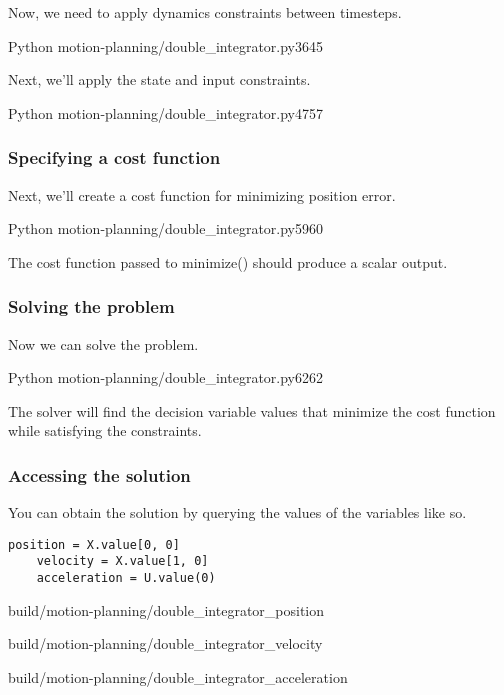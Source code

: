 Now, we need to apply dynamics constraints between timesteps.
\begin{coderemotesubset}{Python}
  {motion-planning/double_integrator.py}{36}{45}
\end{coderemotesubset}

Next, we'll apply the state and input constraints.
\begin{coderemotesubset}{Python}
  {motion-planning/double_integrator.py}{47}{57}
\end{coderemotesubset}

\subsubsection{Specifying a cost function}

Next, we'll create a cost function for minimizing position error.
\begin{coderemotesubset}{Python}
  {motion-planning/double_integrator.py}{59}{60}
\end{coderemotesubset}

The cost function passed to minimize() should produce a scalar output.

\subsubsection{Solving the problem}

Now we can solve the problem.
\begin{coderemotesubset}{Python}
  {motion-planning/double_integrator.py}{62}{62}
\end{coderemotesubset}

The solver will find the decision variable values that minimize the cost
function while satisfying the constraints.

\subsubsection{Accessing the solution}

You can obtain the solution by querying the values of the variables like so.
\begin{code}
  \begin{lstlisting}[style=customPython]
    position = X.value[0, 0]
    velocity = X.value[1, 0]
    acceleration = U.value(0)
  \end{lstlisting}
\end{code}
\begin{bookfigure}
  \begin{minisvg}{2}{build/motion-planning/double_integrator_position}
    \caption{Double integrator position}
  \end{minisvg}
  \hfill
  \begin{minisvg}{2}{build/motion-planning/double_integrator_velocity}
    \caption{Double integrator velocity}
  \end{minisvg}
  \hfill
  \begin{minisvg}{2}{build/motion-planning/double_integrator_acceleration}
    \caption{Double integrator acceleration}
  \end{minisvg}
\end{bookfigure}


